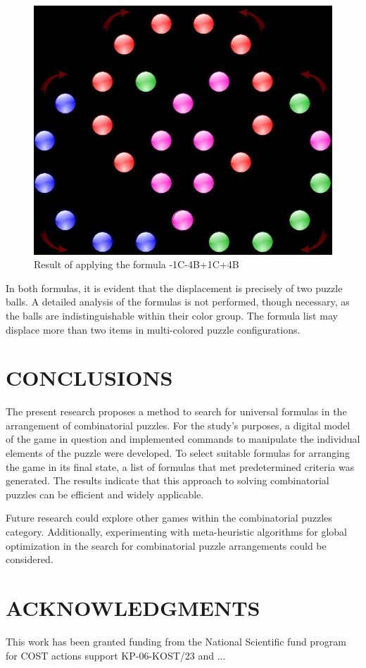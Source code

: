 \documentclass[a4paper,twocolumn,10pt]{article}
\begin{document}
\begin{figure}
	\centering
	\includegraphics[width=1.0\linewidth]{figure03.png}
	\caption{Result of applying the formula -1C-4B+1C+4B}
	\label{figure03}
\end{figure}

In both formulas, it is evident that the displacement is precisely of two puzzle balls. A detailed analysis of the formulas is not performed, though necessary, as the balls are indistinguishable within their color group. The formula list may displace more than two items in multi-colored puzzle configurations.

\section{CONCLUSIONS}

The present research proposes a method to search for universal formulas in the arrangement of combinatorial puzzles. For the study's purposes, a digital model of the game in question and implemented commands to manipulate the individual elements of the puzzle were developed. To select suitable formulas for arranging the game in its final state, a list of formulas that met predetermined criteria was generated. The results indicate that this approach to solving combinatorial puzzles can be efficient and widely applicable.

Future research could explore other games within the combinatorial puzzles category. Additionally, experimenting with meta-heuristic algorithms for global optimization in the search for combinatorial puzzle arrangements could be considered.

\section{ACKNOWLEDGMENTS}

This work has been granted funding from the National Scientific fund program for COST actions support KP-06-KOST/23 and ...


\end{document}
